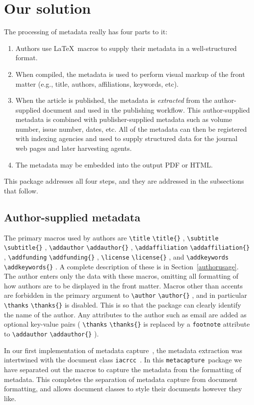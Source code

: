 \documentclass{article}
\newcommand{\pkgname}{\texttt{metacapture}}
\newcommand{\cmd}[2][]{%
  \def\FirstArg{#1}%
  \ifx\FirstArg\empty%
    \texttt{\textbackslash{}#2}%
  \else%
    \texttt{\textbackslash{}#2\{#1\}}%
  \fi
}
\newcommand{\pkg}[1]{\texttt{#1}}
\begin{document}
\section{Our solution}
The processing of metadata really has four parts to it:
\begin{enumerate}
\item \label{supply}Authors use \LaTeX\ macros to supply their metadata in a well-structured format.
\item \label{markup}When compiled, the metadata is used to perform visual markup of
the front matter (e.g., title, authors, affiliations, keywords, etc).
\item \label{extract}When the article is published, the metadata is {\em extracted}
from the author-supplied document and used in the publishing workflow. This author-supplied
metadata is combined with publisher-supplied metadata such as volume number,
issue number, dates, etc.
All of the metadata can then be registered with indexing agencies and used to supply 
structured data for the journal web pages and later harvesting agents.
\item \label{xmp} The metadata may be embedded into the output PDF or HTML.
\end{enumerate}
This package addresses all four steps, and they are addressed in the subsections that follow.

\subsection{Author-supplied metadata}
The primary macros used by authors are \cmd{title},
\cmd{subtitle}, \cmd{addauthor}, \cmd{addaffiliation},
\cmd{addfunding}, \cmd{license},
and \cmd{addkeywords}.  A complete description of these is in
Section~\ref{authorusage}. The author enters only the data with these
macros, omitting all formatting of how authors are to be displayed in
the front matter.  Macros other than accents are forbidden in the
primary argument to \cmd{author}, and in particular \cmd{thanks} is
disabled. This is so that the package can clearly identify the name of
the author. Any attributes to the author such as email are added as
optional key-value pairs (\cmd{thanks} is replaced by a \pkg{footnote}
attribute to \cmd{addauthor}).

In our first implementation of metadata capture~\cite{tugboat}, the
metadata extraction was intertwined with the document
class \texttt{iacrcc}~\cite{iacrcc}. In this \pkgname\ package we have
separated out the macros to capture the metadata from the formatting
of metadata. This completes the separation of metadata capture from
document formatting, and allows document classes to style their documents
however they like.
\end{document}
